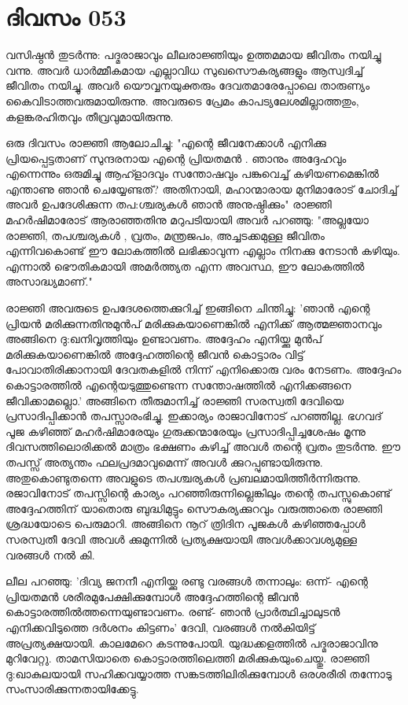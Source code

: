 \newpage
\section{ദിവസം 053}


വസിഷ്ഠന്‍ തുടര്‍ന്നു: പദ്മരാജാവും ലീലരാജ്ഞിയും ഉത്തമമായ ജീവിതം നയിച്ചു വന്നു. അവര്‍ ധാര്‍മ്മീകമായ എല്ലാവിധ സുഖസൌകര്യങ്ങളും ആസ്വദിച്ച്‌ ജീവിതം നയിച്ചു. അവര്‍ യൌവ്വനയുക്തരും ദേവതമാരേപ്പോലെ താരുണ്യം കൈവിടാത്തവരുമായിരുന്നു. അവരുടെ പ്രേമം കാപട്യലേശമില്ലാത്തതും, കളങ്കരഹിതവും തീവ്രവുമായിരുന്നു. 

ഒരു ദിവസം രാജ്ഞി ആലോചിച്ചു: "എന്റെ ജീവനേക്കാള്‍ എനിക്കു പ്രിയപ്പെട്ടതാണ്‌ സുന്ദരനായ എന്റെ പ്രിയതമന്‍ . ഞാനും അദ്ദേഹവും എന്നെന്നും ഒരുമിച്ചു  ആഹ്ളാദവും    സന്തോഷവും പങ്കുവെച്ച്‌ കഴിയണമെങ്കില്‍ എന്താണു ഞാന്‍ ചെയ്യേണ്ടത്‌? അതിനായി, മഹാന്മാരായ മുനിമാരോട്‌ ചോദിച്ച്‌ അവര്‍ ഉപദേശിക്കുന്ന തപ:ശ്ചര്യകള്‍ ഞാന്‍ അനുഷ്ഠിക്കും" രാജ്ഞി മഹര്‍ഷിമാരോട്‌ ആരാഞ്ഞതിനു മറുപടിയായി അവര്‍ പറഞ്ഞു: "അല്ലയോ രാജ്ഞി, തപശ്ചര്യകള്‍ , വ്രതം, മന്ത്രജപം, അച്ചടക്കമുള്ള ജീവിതം എന്നിവകൊണ്ട്‌ ഈ ലോകത്തില്‍ ലഭിക്കാവുന്ന എല്ലാം നിനക്കു നേടാന്‍ കഴിയും. എന്നാല്‍ ഭൌതികമായി അമര്‍ത്ത്യത എന്ന അവസ്ഥ, ഈ ലോകത്തില്‍ അസാദ്ധ്യമാണ്‌."

രാജ്ഞി അവരുടെ ഉപദേശത്തെക്കുറിച്ച്‌ ഇങ്ങിനെ ചിന്തിച്ചു: 'ഞാന്‍ എന്റെ പ്രിയന്‍ മരിക്കുന്നതിനുമുന്‍പ്‌ മരിക്കുകയാണെങ്കില്‍ എനിക്ക്‌ ആത്മജ്ഞാനവും അങ്ങിനെ ദു:ഖനിവൃത്തിയും ഉണ്ടാവണം. അദ്ദേഹം എനിയ്ക്കു മുന്‍പ്‌ മരിക്കുകയാണെങ്കില്‍ അദ്ദേഹത്തിന്റെ ജീവന്‍ കൊട്ടാരം വിട്ട്‌ പോവാതിരിക്കാനായി ദേവതകളില്‍ നിന്ന് എനിക്കൊരു വരം നേടണം. അദ്ദേഹം കൊട്ടാരത്തില്‍ എന്റെയടുത്തുണ്ടെന്ന സന്തോഷത്തില്‍ എനിക്കങ്ങനെ ജീവിക്കാമല്ലൊ.' അങ്ങിനെ തീരുമാനിച്ച്‌ രാജ്ഞി സരസ്വതി ദേവിയെ പ്രസാദിപ്പിക്കാന്‍ തപസ്സാരംഭിച്ചു. ഇക്കാര്യം രാജാവിനോട്‌ പറഞ്ഞില്ല. ഭഗവദ്‌ പൂജ കഴിഞ്ഞ്‌ മഹര്‍ഷിമാരേയും ഗുരുക്കന്മാരേയും പ്രസാദിപ്പിച്ചശേഷം മൂന്നു ദിവസത്തിലൊരിക്കല്‍ മാത്രം ഭക്ഷണം കഴിച്ച്‌ അവള്‍ തന്റെ വ്രതം തുടര്‍ന്നു. ഈ തപസ്സ്‌ അത്യന്തം ഫലപ്രദമാവുമെന്ന് അവള്‍ ക്കുറപ്പുണ്ടായിരുന്നു. അതുകൊണ്ടുതന്നെ അവളുടെ തപശ്ചര്യകള്‍ പ്രബലമായിത്തീര്‍ന്നിരുന്നു. രജാവിനോട്‌ തപസ്സിന്റെ കാര്യം പറഞ്ഞിരുന്നില്ലെങ്കിലും തന്റെ തപസ്സുകൊണ്ട്‌ അദ്ദേഹത്തിന്‌ യാതൊരു ബുദ്ധിമുട്ടും സൌകര്യക്കുറവും വരുത്താതെ രാജ്ഞി ശ്രദ്ധയോടെ പെരുമാറി. അങ്ങിനെ നൂറ്‌ ത്രിദിന പൂജകള്‍ കഴിഞ്ഞപ്പോള്‍ സരസ്വതീ ദേവി അവള്‍ ക്കുമുന്നില്‍ പ്രത്യക്ഷയായി അവള്‍ക്കാവശ്യമുള്ള വരങ്ങള്‍ നല്‍ കി.

ലീല പറഞ്ഞു: 'ദിവ്യ ജനനീ എനിയ്ക്കു രണ്ടു വരങ്ങള്‍ തന്നാലും: ഒന്ന്- എന്റെ പ്രിയതമന്‍ ശരീരമുപേക്ഷിക്കുമ്പോള്‍ അദ്ദേഹത്തിന്റെ ജീവന്‍ കൊട്ടാരത്തില്‍ത്തന്നെയുണ്ടാവണം. രണ്ട്‌- ഞാന്‍ പ്രാര്‍ത്ഥിച്ചാലുടന്‍ എനിക്കവിടുത്തെ ദര്‍ശനം കിട്ടണം' ദേവി, വരങ്ങള്‍ നല്‍കിയിട്ട് അപ്രത്യക്ഷയായി. കാലമേറെ കടന്നുപോയി. യുദ്ധക്കളത്തില്‍ പദ്മരാജാവിനു മുറിവേറ്റു. താമസിയാതെ കൊട്ടാരത്തിലെത്തി മരിക്കുകയുംചെയ്തു. രാജ്ഞി ദു:ഖാകുലയായി സഹിക്കവയ്യാത്ത സങ്കടത്തിലിരിക്കുമ്പോള്‍ ഒരശരീരി തന്നോടു സംസാരിക്കുന്നതായിക്കേട്ടു.
